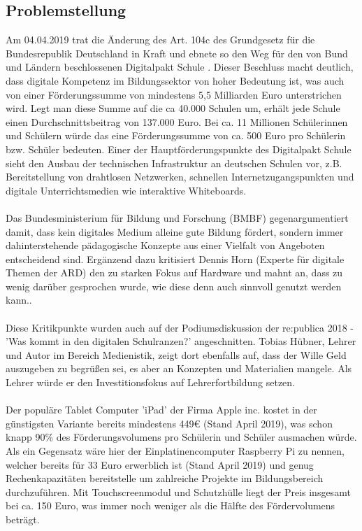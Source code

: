 \subsection{Problemstellung}\label{sec:problemstellung}
Am 04.04.2019 trat die Änderung des Art. 104c des Grundgesetz für die Bundesrepublik Deutschland in Kraft
und ebnete so den Weg für den von Bund und Ländern beschlossenen Digitalpakt Schule \cite{Art104cG55:online}. 
Dieser Beschluss macht deutlich, dass digitale Kompetenz im Bildungssektor von hoher Bedeutung ist, was auch von einer Förderungssumme von mindestens 5,5 Milliarden Euro unterstrichen wird. 
Legt man diese Summe auf die ca 40.000 Schulen um, erhält jede Schule einen Durchschnittsbeitrag von 137.000 Euro. Bei ca. 11 Millionen Schülerinnen und Schülern würde das eine Förderungssumme von ca. 500 Euro pro Schülerin bzw. Schüler bedeuten. 
Einer der Hauptförderungspunkte des Digitalpakt Schule sieht den Ausbau der technischen Infrastruktur
an deutschen Schulen vor, z.B. Bereitstellung von drahtlosen Netzwerken, schnellen Internetzugangspunkten und digitale Unterrichtsmedien wie interaktive Whiteboards.
\\ \\
Das Bundesministerium für Bildung und Forschung (BMBF) gegenargumentiert damit, dass kein digitales Medium alleine gute Bildung fördert, sondern immer dahinterstehende pädagogische Konzepte aus einer Vielfalt von Angeboten entscheidend sind. \cite{dpakt2019:online} Ergänzend dazu kritisiert Dennis Horn (Experte für digitale Themen der ARD) den zu starken Fokus auf Hardware und mahnt an, dass zu wenig darüber gesprochen wurde, wie diese denn auch sinnvoll genutzt werden kann.\cite{Horn2018:online}. \\ \\
Diese Kritikpunkte wurden auch auf der Podiumsdiskussion der re:publica 2018 - 'Was kommt in den digitalen Schulranzen?' angeschnitten. Tobias Hübner, Lehrer und Autor im Bereich Medienistik, zeigt dort ebenfalls auf, dass der Wille Geld auszugeben zu begrüßen sei, es aber an Konzepten und Materialien mangele. Als Lehrer würde er den Investitionsfokus auf Lehrerfortbildung setzen.
\\ \\

Der populäre Tablet Computer 'iPad' der Firma Apple inc. kostet in der günstigsten Variante bereits mindestens 449€ \cite{iPadmini65:online} (Stand April 2019), was schon knapp 90\% des Förderungsvolumens pro Schülerin und Schüler ausmachen würde. Als ein Gegensatz wäre hier der Einplatinencomputer Raspberry Pi zu nennen, welcher bereits für 33 Euro erwerblich ist (Stand April 2019) und genug Rechenkapazitäten bereitstelle um zahlreiche Projekte im Bildungsbereich durchzuführen. Mit Touchscreenmodul und Schutzhülle liegt der Preis insgesamt bei ca. 150 Euro, was immer noch weniger als die Hälfte des Fördervolumens beträgt. 

